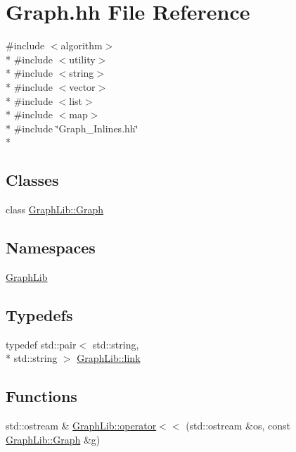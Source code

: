 \hypertarget{Graph_8hh}{\section{Graph.\-hh File Reference}
\label{Graph_8hh}
}
{\ttfamily \#include $<$algorithm$>$}\\*
{\ttfamily \#include $<$utility$>$}\\*
{\ttfamily \#include $<$string$>$}\\*
{\ttfamily \#include $<$vector$>$}\\*
{\ttfamily \#include $<$list$>$}\\*
{\ttfamily \#include $<$map$>$}\\*
{\ttfamily \#include \char`\"{}Graph\-\_\-\-Inlines.\-hh\char`\"{}}\\*
\subsection*{Classes}
\begin{DoxyCompactItemize}
\item 
class \hyperlink{classGraphLib_1_1Graph}{Graph\-Lib\-::\-Graph}
\end{DoxyCompactItemize}
\subsection*{Namespaces}
\begin{DoxyCompactItemize}
\item 
\hyperlink{namespaceGraphLib}{Graph\-Lib}
\end{DoxyCompactItemize}
\subsection*{Typedefs}
\begin{DoxyCompactItemize}
\item 
typedef std\-::pair$<$ std\-::string, \\*
std\-::string $>$ \hyperlink{namespaceGraphLib_a377ccf6aaeadf5536de135d66360d225}{Graph\-Lib\-::link}
\end{DoxyCompactItemize}
\subsection*{Functions}
\begin{DoxyCompactItemize}
\item 
std\-::ostream \& \hyperlink{namespaceGraphLib_af3b2bbc45436f913f252029fd7da7156}{Graph\-Lib\-::operator$<$$<$} (std\-::ostream \&os, const \hyperlink{classGraphLib_1_1Graph}{Graph\-Lib\-::\-Graph} \&g)
\end{DoxyCompactItemize}
